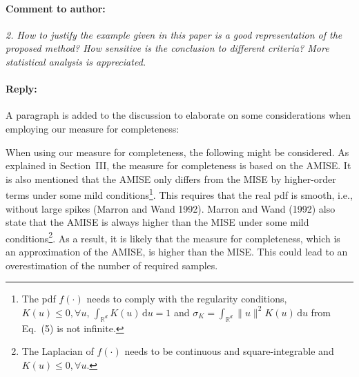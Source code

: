 \documentclass[10pt,final,a4paper,oneside,onecolumn]{article}
\newcommand*{\ud}{\mathrm{\,d}}
\newcommand{\toauthor}{\paragraph*{Comment to author:} \itshape}
\newcommand{\fromauthor}{\paragraph*{Reply:} \normalfont}
\newcommand{\cstart}{\color{red}}
\newcommand{\cend}{\color{black}}
\begin{document}
\toauthor 2. How to justify the example given in this paper is a good representation of the proposed method? How sensitive is the conclusion to different criteria? More statistical analysis is appreciated.

\fromauthor A paragraph is added to the discussion to elaborate on some considerations when employing our measure for completeness:

\cstart
When using our measure for completeness, the following might be considered. As explained in Section~III, the measure for completeness is based on the AMISE. It is also mentioned that the AMISE only differs from the MISE by higher-order terms under some mild conditions\footnote{The pdf $f(\cdot)$ needs to comply with the regularity conditions, $K(u) \leq 0, \forall u$, $\int_{\mathbb{R}^d} K(u) \ud u = 1$ and $\sigma_K=\int_{\mathbb{R}^d} \|u\|^2 K(u) \ud u$ from Eq.~(5) is not infinite.}. This requires that the real pdf is smooth, i.e., without large spikes (Marron and Wand 1992). Marron and Wand (1992) also state that the AMISE is always higher than the MISE under some mild conditions\footnote{The Laplacian of $f(\cdot)$ needs to be continuous and square-integrable and $K(u) \leq 0, \forall u$.}. As a result, it is likely that the measure for completeness, which is an approximation of the AMISE, is higher than the MISE. This could lead to an overestimation of the number of required samples.
\cend
\end{document}

